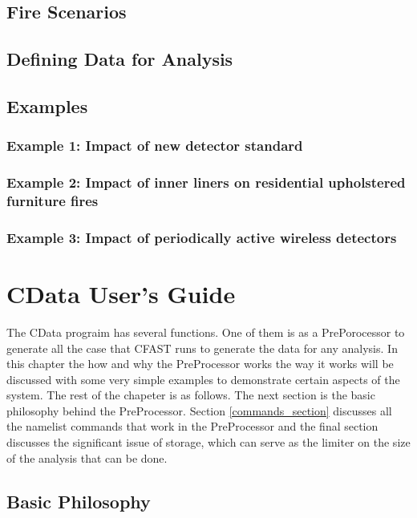 \documentclass[12pt,twoside]{book}
\begin{document}
\clearpage

\section{Fire Scenarios}

\section{Defining Data for Analysis}

\section{Examples}

\subsection{Example 1: Impact of new detector standard}

\subsection{Example 2: Impact of inner liners on residential upholstered furniture fires}

\subsection{Example 3: Impact of periodically active wireless detectors}

%
%

\chapter{CData User's Guide}
The CData prograim has several functions. One of them is as a PrePorocessor to generate all the case that CFAST runs to generate the data for any analysis. In this chapter the how and why the PreProcessor works the way it works will be discussed with some very simple examples to demonstrate certain aspects of the system. The rest of the chapeter is as follows. The next section is the basic philosophy behind the PreProcessor. Section \ref{commands_section} discusses all the namelist commands that work in the PreProcessor and the final section discusses the significant issue of storage, which can serve as the limiter on the size of the analysis that can be done.

\section{Basic Philosophy}
\end{document}
